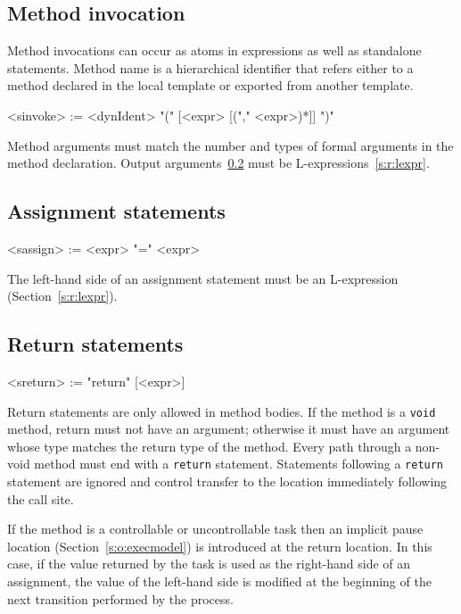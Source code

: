 \documentclass{report}
\newcommand{\src}[1]{\texttt{#1}}
\begin{document}
\subsection{Method invocation}

Method invocations can occur as atoms in expressions as well as 
standalone statements.  Method name is a hierarchical identifier 
that refers either to a method declared in the local template or 
exported from another template.
\begin{bnflisting}{}
<sinvoke> := <dynIdent> "(" [<expr> [("," <expr>)*]] ")"
\end{bnflisting}
Method arguments must match the number and types of formal 
arguments in the method declaration.  Output arguments~\ref{} must 
be L-expressions~\ref{s:r:lexpr}.

\subsection{Assignment statements}

\begin{bnflisting}{}
<sassign> := <expr> "=" <expr>
\end{bnflisting}

The left-hand side of an assignment statement must be an 
L-expression (Section~\ref{s:r:lexpr}).  

\subsection{Return statements}\label{s:r:return}

\begin{bnflisting}{}
<sreturn> := "return" [<expr>]
\end{bnflisting}

Return statements are only allowed in method bodies.  If the 
method is a \src{void} method, return must not have an argument; 
otherwise it must have an argument whose type matches the return 
type of the method.  Every path through a non-void method must end 
with a \src{return} statement.  Statements following a 
\src{return} statement are ignored and control transfer to the 
location immediately following the call site.  

If the method is a controllable or uncontrollable task then an 
implicit pause location (Section~\ref{s:o:execmodel}) is 
introduced at the return location.  In this case, if the value 
returned by the task is used as the right-hand side of an 
assignment, the value of the left-hand side is modified at the 
beginning of the next transition performed by the process.
\end{document}
